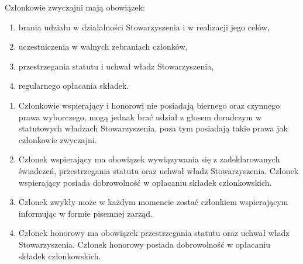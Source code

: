 \documentclass{article}
\begin{document}
Członkowie zwyczajni mają obowiązek:
\begin{enumerate}
\item
  brania udziału w działalności Stowarzyszenia i w realizacji jego celów,
\item
  uczestniczenia w walnych zebraniach członków,
\item
  przestrzegania statutu i uchwał władz Stowarzyszenia,
\item
  regularnego opłacania składek.
\end{enumerate}

\begin{enumerate}
\item
  Członkowie wspierający i honorowi nie posiadają biernego oraz czynnego prawa wyborczego, mogą jednak brać udział z głosem doradczym w statutowych władzach Stowarzyszenia, poza tym posiadają takie prawa jak członkowie zwyczajni.
\item
  Członek wspierający ma obowiązek wywiązywania się z zadeklarowanych świadczeń, przestrzegania statutu oraz uchwał władz Stowarzyszenia.
  Członek wspierający posiada dobrowolność w opłacaniu składek członkowskich.
\item
  Członek zwykły może w każdym momencie zostać członkiem wspierającym informując w formie pisemnej zarząd.
\item
  Członek honorowy ma obowiązek przestrzegania statutu oraz uchwał władz Stowarzyszenia. Członek honorowy posiada dobrowolność w opłacaniu składek członkowskich.
\end{enumerate}
\end{document}
